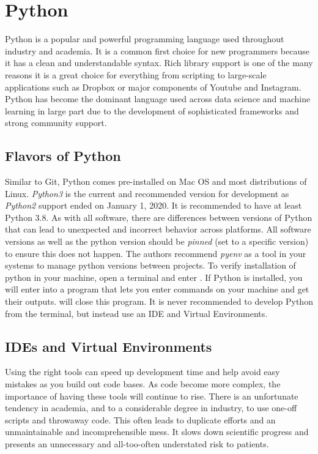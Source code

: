 \section{Python}
Python is a popular and powerful programming language used throughout industry and academia. It is a common first choice for new programmers because it has a clean and understandable syntax. Rich library support is one of the many reasons it is a great choice for everything from scripting to large-scale applications such as Dropbox or major components of Youtube and Instagram. Python has become the dominant language used across data science and machine learning in large part due to the development of sophisticated frameworks and strong community support.

\subsection{Flavors of Python}
Similar to Git, Python comes pre-installed on Mac OS and most distributions of Linux. \textit{Python3} is the current and recommended version for development as \textit{Python2} support ended on January 1, 2020.
It is recommended to have at least Python 3.8. As with all software, there are differences between versions of Python that can lead to unexpected and incorrect behavior across platforms.
All software versions as well as the python version should be \textit{pinned} (set to a specific version) to ensure this does not happen.
The authors recommend \textit{pyenv} as a tool in your systems to manage python versions between projects.
To verify installation of python in your machine, open a terminal and enter .
If Python is installed, you will enter into a program that lets you enter commands on your machine and get their outputs.  will close this program.
It is never recommended to develop Python from the terminal, but instead use an IDE and Virtual Environments.

\subsection{IDEs and Virtual Environments}

Using the right tools can speed up development time and help avoid easy mistakes as you build out code bases.
As code become more complex, the importance of having these tools will continue to rise.
There is an unfortunate tendency in academia, and to a considerable degree in industry, to use one-off scripts and throwaway code.
This often leads to duplicate efforts and an unmaintainable and incomprehensible mess.
It slows down scientific progress and presents an unnecessary and all-too-often understated risk to patients.

